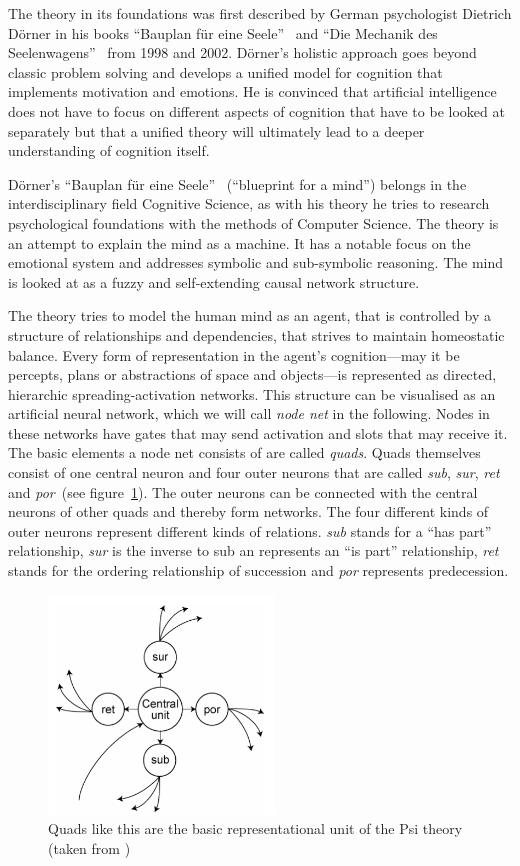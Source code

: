 The theory in its foundations was first described by German psychologist Dietrich Dörner in his books ``Bauplan für eine Seele''~\cite{Doerner1998} and ``Die Mechanik des Seelenwagens''~\cite{dorner2002mechanik} from 1998 and 2002. Dörner's holistic approach goes beyond classic problem solving and develops a unified model for cognition that implements motivation and emotions. He is convinced that artificial intelligence does not have to focus on different aspects of cognition that have to be looked at separately but that a unified theory will ultimately lead to a deeper understanding of cognition itself.
    
Dörner's ``Bauplan für eine Seele''~\cite{Doerner1998} (``blueprint for a mind'') belongs in the interdisciplinary field Cognitive Science, as with his theory he tries to research psychological foundations with the methods of Computer Science. The theory is an attempt to explain the mind as a machine. It has a notable focus on the emotional system and addresses symbolic and sub-symbolic reasoning.  The mind is looked at as a fuzzy and self-extending causal network structure.

The theory tries to model the human mind as an agent, that is controlled by a structure of relationships and dependencies, that strives to maintain homeostatic balance. Every form of representation in the agent's cognition---may it be percepts, plans or abstractions of space and objects---is represented as directed, hierarchic spreading-activation networks. This structure can be visualised as an artificial neural network, which we will call \emph{node net} in the following. Nodes in these networks have gates that may send activation and slots that may receive it. The basic elements a node net consists of are called \emph{quads}. Quads themselves consist of one central neuron and four outer neurons that are called \emph{sub}, \emph{sur}, \emph{ret} and \emph{por}~(see figure~\ref{quad}). The outer neurons can be connected with the central neurons of other quads and thereby form networks. The four different kinds of outer neurons represent different kinds of relations. \emph{sub} stands for a ``has part'' relationship, \emph{sur} is the inverse to sub an represents an ``is part'' relationship, \emph{ret} stands for the ordering relationship of succession and \emph{por} represents predecession.

\begin{figure}[h]
  \centering
    \includegraphics[width=6cm]{graphics/quad}
  \caption{Quads like this are the basic representational unit of the Psi theory (taken from \cite{Bach:2009:PSI:1611304})}
  \label{quad}
\end{figure}

